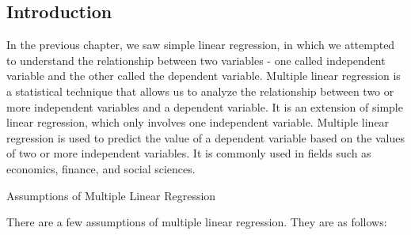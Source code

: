\documentclass[
  letterpaper,
  paper =a4,
  twoside,
  openright,
  headsepline,
  footsepline,
  listof = totocnumbered,
  chapterprefix = true,
  firstiscover]{scrbook}
\begin{document}
\hypertarget{introduction-1}{%
\subsection{Introduction}\label{introduction-1}}

In the previous chapter, we saw simple linear regression, in which we
attempted to understand the relationship between two variables - one
called independent variable and the other called the dependent variable.
Multiple linear regression is a statistical technique that allows us to
analyze the relationship between two or more independent variables and a
dependent variable. It is an extension of simple linear regression,
which only involves one independent variable. Multiple linear regression
is used to predict the value of a dependent variable based on the values
of two or more independent variables. It is commonly used in fields such
as economics, finance, and social sciences.

Assumptions of Multiple Linear Regression

There are a few assumptions of multiple linear regression. They are as
follows:
\end{document}

